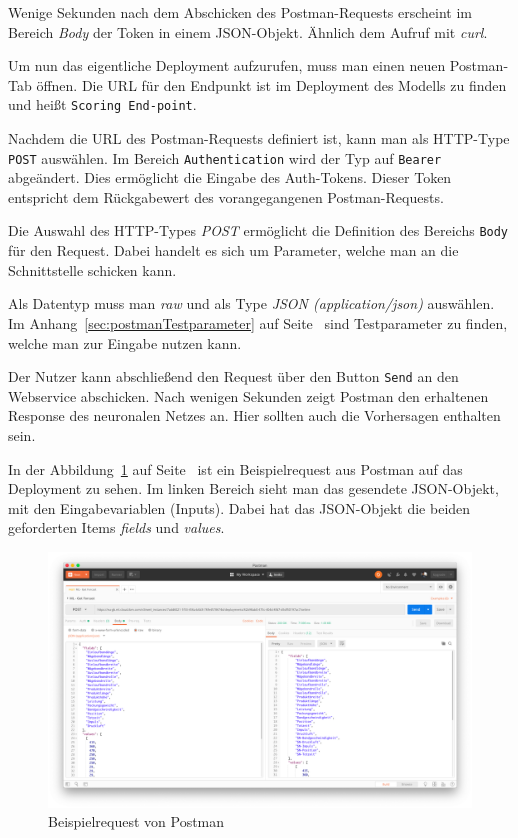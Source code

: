 Wenige Sekunden nach dem Abschicken des Postman-Requests erscheint im Bereich \textit{Body} der Token in einem
JSON-Objekt. Ähnlich dem Aufruf mit \textit{curl}.

Um nun das eigentliche Deployment aufzurufen, muss man einen neuen Postman-Tab öffnen. Die URL für den Endpunkt ist im
Deployment des Modells zu finden und heißt \texttt{Scoring End-point}.

Nachdem die URL des Postman-Requests definiert ist, kann man als HTTP-Type \texttt{POST} auswählen. Im Bereich
\texttt{Authentication} wird der Typ auf \texttt{Bearer} abgeändert. Dies ermöglicht die Eingabe des Auth-Tokens. Dieser
Token entspricht dem Rückgabewert des vorangegangenen Postman-Requests.

Die Auswahl des HTTP-Types \textit{POST} ermöglicht die Definition des Bereichs \texttt{Body} für den Request. Dabei
handelt es sich um Parameter, welche man an die Schnittstelle schicken kann.

Als Datentyp muss man \textit{raw} und als Type \textit{JSON (application/json)} auswählen. Im
Anhang~\ref{sec:postmanTestparameter} auf Seite~\pageref{sec:postmanTestparameter} sind Testparameter zu finden, welche
man zur Eingabe nutzen kann.

Der Nutzer kann abschließend den Request über den Button \texttt{Send} an den Webservice abschicken. Nach wenigen
Sekunden zeigt Postman den erhaltenen Response des neuronalen Netzes an. Hier sollten auch die Vorhersagen enthalten
sein.

In der Abbildung~\ref{fig:umsetzung_deployment_postman} auf Seite~\pageref{fig:umsetzung_deployment_postman} ist ein
Beispielrequest aus Postman auf das Deployment zu sehen. Im linken Bereich sieht man das gesendete JSON-Objekt, mit den
Eingabevariablen (Inputs). Dabei hat das JSON-Objekt die beiden geforderten Items \textit{fields} und \textit{values}.

\begin{figure}[h]
    \centering
    \includegraphics[width=\textwidth]{images/kapitel_3/deployment_postman.png}
    \caption{Beispielrequest von Postman}
    \label{fig:umsetzung_deployment_postman}
\end{figure}

